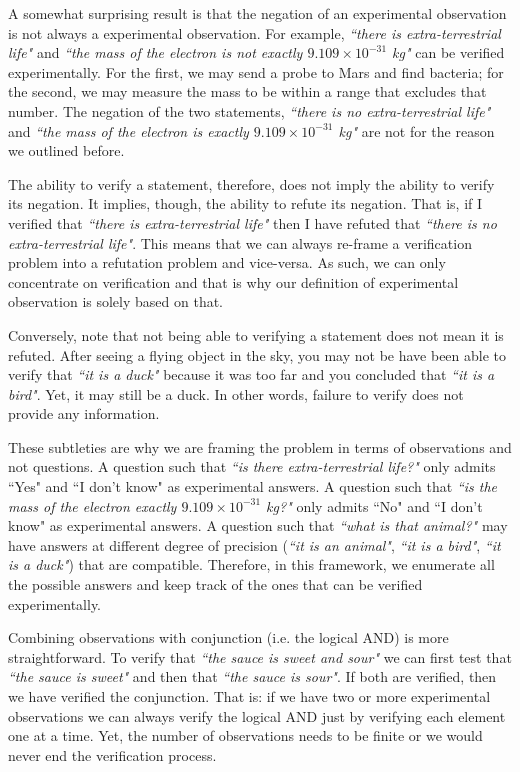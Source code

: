 \documentclass[11pt,letterpaper,fleqn]{memoir} %
\begin{document}
A somewhat surprising result is that the negation of an experimental observation is not always a experimental observation. For example, \emph{``there is extra-terrestrial life"} and \emph{``the mass of the electron is not exactly $9.109 \times 10^{-31}$ kg"} can be verified experimentally. For the first, we may send a probe to Mars and find bacteria; for the second, we may measure the mass to be within a range that excludes that number. The negation of the two statements,  \emph{``there is no extra-terrestrial life"} and \emph{``the mass of the electron is exactly $9.109 \times 10^{-31}$ kg"} are not for the reason we outlined before.

The ability to verify a statement, therefore, does not imply the ability to verify its negation. It implies, though, the ability to refute its negation. That is, if I verified that \emph{``there is extra-terrestrial life"} then I have refuted that \emph{``there is no extra-terrestrial life"}. This means that we can always re-frame a verification problem into a refutation problem and vice-versa. As such, we can only concentrate on verification and that is why our definition of experimental observation is solely based on that.

Conversely, note that not being able to verifying a statement does not mean it is refuted. After seeing a flying object in the sky, you may not be have been able to verify that \emph{``it is a duck"} because it was too far and you concluded that \emph{``it is a bird"}. Yet, it may still be a duck. In other words, failure to verify does not provide any information.

These subtleties are why we are framing the problem in terms of observations and not questions. A question such that \emph{``is there extra-terrestrial life?"} only admits ``Yes" and ``I don't know" as experimental answers. A question such that \emph{``is the mass of the electron exactly $9.109 \times 10^{-31}$ kg?"} only admits ``No" and ``I don't know" as experimental answers. A question such that \emph{``what is that animal?"} may have answers at different degree of precision (\emph{``it is an animal"}, \emph{``it is a bird"}, \emph{``it is a duck"}) that are compatible. Therefore, in this framework, we enumerate all the possible answers and keep track of the ones that can be verified experimentally.

Combining observations with conjunction (i.e. the logical AND) is more straightforward. To verify that \emph{``the sauce is sweet and sour"} we can first test that \emph{``the sauce is sweet"} and then that \emph{``the sauce is sour"}. If both are verified, then we have verified the conjunction. That is: if we have two or more experimental observations we can always verify the logical AND just by verifying each element one at a time. Yet, the number of observations needs to be finite or we would never end the verification process.
\end{document}
